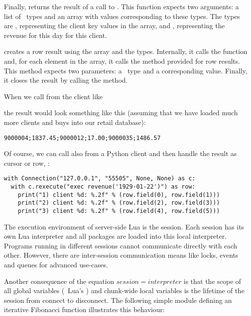 Finally,  returns the result
of a call to .
This function expects two arguments:
a list of \nowdb\ types and an array with
values corresponding to these types.
The types are , representing the
client key values in the  array,
and , representing the revenue
for this day for this client.

 creates a row result
using the array and the types. Internally,
it calls the  function
and, for each element in the array, it calls
the method  provided for row results.
This method expects two parameters:
a \nowdb\ type and a corresponding value.
Finally, it closes the result by calling
the  method.

When we call  from the client like


the result would look something like this
(assuming that we have loaded much more
clients and buys into our retail database):
\begin{verbatim}
9000004;1837.45;9000012;17.00;9000035;1486.57
\end{verbatim}

\begin{minipage}{\textwidth}
Of course, we can call 
also from a Python client and then handle
the result as cursor or row, \eg:

\begin{python}
\begin{lstlisting}
with Connection("127.0.0.1", "55505", None, None) as c:
  with c.rexecute("exec revenue('1929-01-22')") as row:
    print("1) client %d: %.2f" % (row.field(0), row.field(1)))
    print("2) client %d: %.2f" % (row.field(2), row.field(3)))
    print("3) client %d: %.2f" % (row.field(4), row.field(5)))
\end{lstlisting}
\end{python}
\end{minipage}

The execution environment of server-side Lua
is the session. Each session has its own
Lua interpreter and all packages are loaded
into this local interpreter. Programs running
in different sessions cannot communicate
directly with each other.
However, there are inter-session
communication means like locks, events and
queues for advanced use-cases.

Another consequence of the equation
$session = interpreter$ is that the scope
of all global variables (\ie\ Lua's )
and chunk-wide local
variables is the lifetime of the session
from connect to disconnect.
The following simple module defining an iterative
Fibonacci function illustrates this behaviour:

